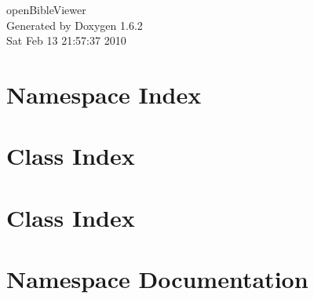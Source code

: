 \documentclass[a4paper]{book}
\begin{document}
\hypersetup{pageanchor=false}
\begin{titlepage}
\vspace*{7cm}
\begin{center}
{\Large openBibleViewer }\\
\vspace*{1cm}
{\large Generated by Doxygen 1.6.2}\\
\vspace*{0.5cm}
{\small Sat Feb 13 21:57:37 2010}\\
\end{center}
\end{titlepage}
\clearemptydoublepage
{}
\tableofcontents
\clearemptydoublepage
{}
\hypersetup{pageanchor=true}
\chapter{Namespace Index}

\chapter{Class Index}

\chapter{Class Index}

\chapter{Namespace Documentation}

\end{document}
